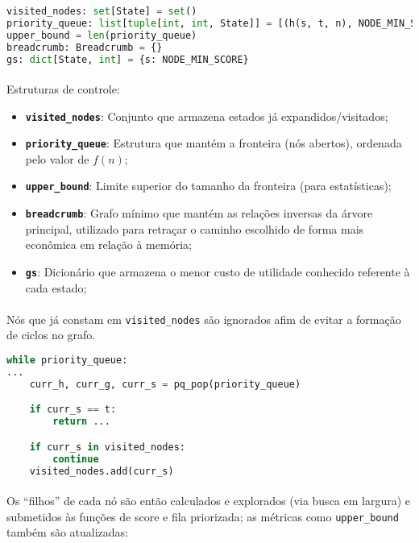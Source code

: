 \documentclass[12pt]{article}
\begin{document}
\begin{lstlisting}[language=python]
visited_nodes: set[State] = set()
priority_queue: list[tuple[int, int, State]] = [(h(s, t, n), NODE_MIN_SCORE, s)]
upper_bound = len(priority_queue)
breadcrumb: Breadcrumb = {}
gs: dict[State, int] = {s: NODE_MIN_SCORE}
\end{lstlisting}

\paragraph{}
Estruturas de controle:

\begin{itemize}
  \item \textbf{\texttt{visited\_nodes}}: Conjunto que armazena estados já expandidos/visitados;
  \item \textbf{\texttt{priority\_queue}}: Estrutura que mantém a fronteira (nós abertos), ordenada pelo valor de $f(n)$;
  \item \textbf{\texttt{upper\_bound}}: Limite superior do tamanho da fronteira (para estatísticas);
  \item \textbf{\texttt{breadcrumb}}: Grafo mínimo que mantém as relações inversas da árvore principal, utilizado para
    retraçar o caminho escolhido de forma mais econômica em relação à memória;
  \item \textbf{\texttt{gs}}: Dicionário que armazena o menor custo de utilidade conhecido referente à cada estado;
\end{itemize}

\paragraph{}
Nós que já constam em \texttt{visited\_nodes} são ignorados afim de evitar a formação de ciclos no grafo.

\begin{lstlisting}[language=python]
while priority_queue:
...
    curr_h, curr_g, curr_s = pq_pop(priority_queue)

    if curr_s == t:
        return ...

    if curr_s in visited_nodes:
        continue
    visited_nodes.add(curr_s)
\end{lstlisting}

\paragraph{}
Os ``filhos'' de cada nó são então calculados e explorados (via busca em largura) e submetidos às funções de score e
fila priorizada; as métricas como \texttt{upper\_bound} também são atualizadas:
\end{document}
